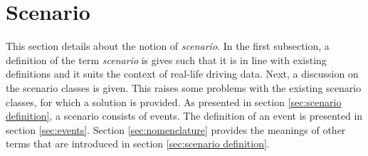 \section{Scenario}
\label{sec:scenario}

This section details about the notion of \emph{scenario}. In the first subsection, a definition of the term \emph{scenario} is gives such that it is in line with existing definitions and it suits the context of real-life driving data. Next, a discussion on the scenario classes is given. This raises some problems with the existing scenario classes, for which a solution is provided. As presented in section \ref{sec:scenario definition}, a scenario consists of events. The definition of an event is presented in section \ref{sec:events}. Section \ref{sec:nomenclature} provides the meanings of other terms that are introduced in section \ref{sec:scenario definition}.





